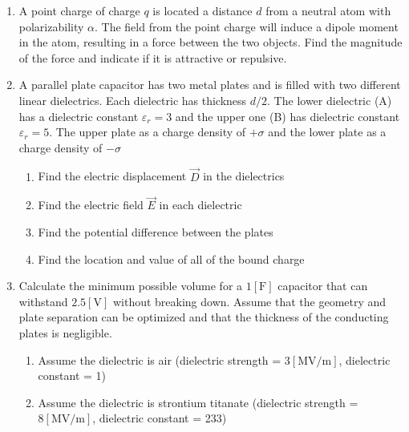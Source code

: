 \begin{enumerate}

  \item A point charge of charge $q$ is located a distance $d$ from a neutral atom with polarizability $\alpha$.  The field from the point charge will induce a dipole moment in the atom, resulting in a force between the two objects.  Find the magnitude of the force and indicate if it is attractive or repulsive.

  \item A parallel plate capacitor has two metal plates and is filled with two different linear dielectrics. Each dielectric has thickness $d/2$.  The lower dielectric (A) has a dielectric constant $\varepsilon_r=3$ and the upper one (B) has dielectric constant $\varepsilon_r=5$.  The upper plate as a charge density of $+\sigma$ and the lower plate as a charge density of $-\sigma$

    \begin{enumerate}

      \item Find the electric displacement $\vec{D}$ in the dielectrics

      \item Find the electric field $\vec{E}$ in each dielectric

      \item Find the potential difference between the plates

      \item Find the location and value of all of the bound charge

    \end{enumerate}

  \item Calculate the minimum possible volume for a $1[\si{\farad}]$ capacitor that can withstand $2.5[\si{\volt}]$ without breaking down. Assume that the geometry and plate separation can be optimized and that the thickness of the conducting plates is negligible.

    \begin{enumerate}

      \item Assume the dielectric is air (dielectric strength = $3[\si{\mega\volt}/\si{\meter}]$, dielectric constant = 1)

      \item Assume the dielectric is strontium titanate (dielectric strength = $8[\si{\mega\volt}/\si{\meter}]$, dielectric constant = 233)


\end{enumerate}
\end{enumerate}
